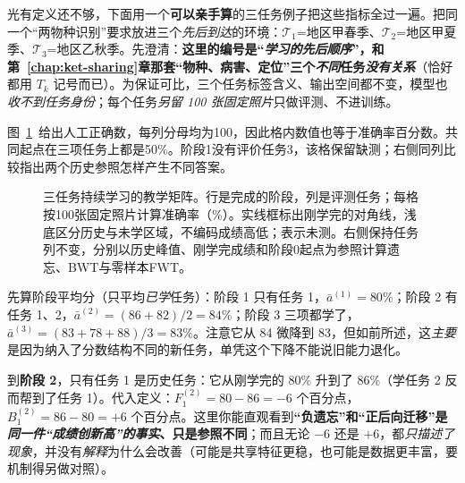 光有定义还不够，下面用一个\textbf{可以亲手算}的三任务例子把这些指标全过一遍。把同一个“两物种识别”要求放进三个\emph{先后到达}的环境：$\mathcal T_1$=地区甲春季、$\mathcal T_2$=地区甲夏季、$\mathcal T_3$=地区乙秋季。先澄清：\textbf{这里的编号是“\emph{学习的先后顺序}”，和第~\ref{chap:ket-sharing}章那套“物种、病害、定位”三个\emph{不同}任务\emph{没有关系}}（恰好都用 $T_k$ 记号而已）。为保证可比，三个任务标签含义、输出空间都不变，模型也\emph{收不到任务身份}；每个任务\emph{另留 100 张固定照片}只做评测、不进训练。

图~\ref{fig:ket-evaluation-matrix}~给出人工正确数，每列分母均为100，因此格内数值也等于准确率百分数。共同起点在三项任务上都是50\%。阶段1没有评价任务3，该格保留缺测；右侧同列比较指出两个历史参照怎样产生不同答案。

\begin{figure}[htbp]
  \centering
  
  \caption{三任务持续学习的教学矩阵。行是完成的阶段，列是评测任务；每格按100张固定照片计算准确率（\%）。实线框标出刚学完的对角线，浅底区分历史与未学区域，不编码成绩高低；\textemdash 表示未测。右侧保持任务列不变，分别以历史峰值、刚学完成绩和阶段0起点为参照计算遗忘、BWT与零样本FWT。}
  \label{fig:ket-evaluation-matrix}
\end{figure}

先算阶段平均分（只平均\emph{已学}任务）：阶段 1 只有任务 1，$\bar a^{(1)}=80\%$；阶段 2 有任务 1、2，$\bar a^{(2)}=(86+82)/2=84\%$；阶段 3 三项都学了，$\bar a^{(3)}=(83+78+88)/3=83\%$。注意它从 84 微降到 83，但如前所述，这\emph{主要}是因为纳入了分数结构不同的新任务，单凭这个下降不能说旧能力退化。

到\textbf{阶段 2}，只有任务 1 是历史任务：它从刚学完的 80\% 升到了 86\%（学任务 2 反而帮到了任务 1）。代入定义：$F_1^{(2)}=80-86=-6$ 个百分点，$B_1^{(2)}=86-80=+6$ 个百分点。这里你能直观看到\textbf{“负遗忘”和“正后向迁移”是\emph{同一件“成绩创新高”的事实}、只是参照不同}；而且无论 $-6$ 还是 $+6$，都\emph{只描述了现象}，并没有\emph{解释}为什么会改善（可能是共享特征更稳，也可能是数据更丰富，要机制得另做对照）。

